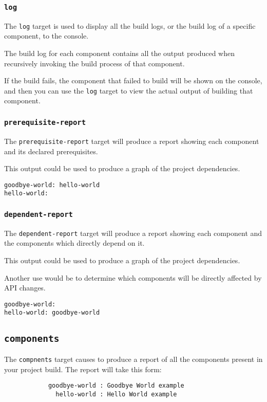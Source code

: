 \subsubsection{\texttt{log}}

The \texttt{log} target is used to display all the build logs, or the
build log of a specific component, to the console.

The build log for each component contains all the output produced when
recursively invoking the build process of that component.

If the build fails, the component that failed to build will be shown
on the console, and then you can use the \texttt{log} target to view
the actual output of building that component.


\subsubsection{\texttt{prerequisite-report}}

The \texttt{prerequisite-report} target will produce a report showing
each component and its declared prerequisites.

This output could be used to produce a graph of the project dependencies.

\begin{verbatim}
goodbye-world: hello-world
hello-world:
\end{verbatim}

\subsubsection{\texttt{dependent-report}}

The \texttt{dependent-report} target will produce a report showing
each component and the components which directly depend on it.

This output could be used to produce a graph of the project
dependencies.

Another use would be to determine which components will be directly
affected by API changes.

\begin{verbatim}
goodbye-world:
hello-world: goodbye-world
\end{verbatim}

\subsection{\texttt{components}}\label{lmsbw:target:components}

The \texttt{compnents} target causes \lmsbw to produce a report of all
the components present in your project build.  The report will take
this form:

\begin{verbatim}
            goodbye-world : Goodbye World example
              hello-world : Hello World example
\end{verbatim}
